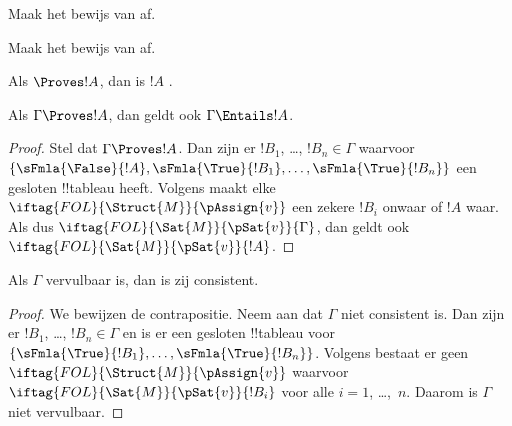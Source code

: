 \documentclass[openany]{memoir}
\begin{document}
\begin{prob}
Maak het bewijs van  af.
\end{prob}
\tagendprob

\begin{prob}
Maak het bewijs van  af.
\end{prob}
\tagendprob

\begin{cor}
Als $\Proves !A$, dan is $!A$ .
\end{cor}

\begin{cor}
Als $\Gamma \Proves !A$, dan geldt ook $\Gamma \Entails !A$.
\end{cor}

\begin{proof}
  Stel dat $\Gamma \Proves !A$. Dan zijn er $!B_1$, \dots,
  $!B_n \in \Gamma$ waarvoor
  $\{\sFmla{\False}{!A}, \sFmla{\True}{!B_1}, \dots,
  \sFmla{\True}{!B_n}\}$ een gesloten !!{tableau} heeft. Volgens
   maakt elke
  ~$\iftag{FOL}{\Struct{M}}{\pAssign{v}}$
  een zekere $!B_i$ onwaar of $!A$ waar. Als dus
  $\iftag{FOL}{\Sat{M}}{\pSat{v}}{\Gamma}$, dan geldt ook
  $\iftag{FOL}{\Sat{M}}{\pSat{v}}{!A}$.
\end{proof}

\begin{cor}
Als $\Gamma$ vervulbaar is, dan is zij consistent.
\end{cor}

\begin{proof}
We bewijzen de contrapositie. Neem aan dat $\Gamma$ niet consistent
is. Dan zijn er $!B_1$, \dots, $!B_n \in \Gamma$ en is er een gesloten
!!{tableau} voor
$\{\sFmla{\True}{!B_1}, \dots, \sFmla{\True}{!B_n}\}$. Volgens
 bestaat er geen
$\iftag{FOL}{\Struct{M}}{\pAssign{v}}$ waarvoor
$\iftag{FOL}{\Sat{M}}{\pSat{v}}{!B_i}$ voor alle $i=1$, \dots,~$n$.
Daarom is $\Gamma$ niet vervulbaar.
\end{proof}
\endgroup

\begingroup
\def\olfilename{OLP-0110}
\def\olfilepath{content/first-order-logic/tableaux/}
\hypertarget{unit-OLP-0110}{}
\end{document}
